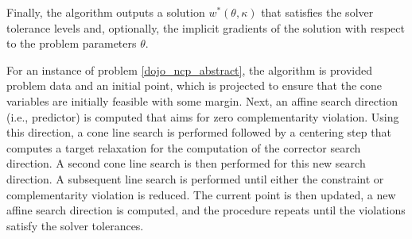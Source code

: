 Finally, the algorithm outputs a solution $w^*(\theta, \kappa)$ that satisfies the solver tolerance levels and, optionally, the implicit gradients of the solution with respect to the problem parameters $\theta$.

For an instance of problem \eqref{dojo_ncp_abstract}, the algorithm is provided problem data and an initial point, which is projected to ensure that the cone variables are initially feasible with some margin. Next, an affine search direction (i.e., predictor) is computed that aims for zero complementarity violation. Using this direction, a cone line search is performed followed by a centering step that computes a target relaxation for the computation of the corrector search direction. A second cone line search is then performed for this new search direction. A subsequent line search is performed until either the constraint or complementarity violation is reduced. The current point is then updated, a new affine search direction is computed, and the procedure repeats until the violations satisfy the solver tolerances. 

